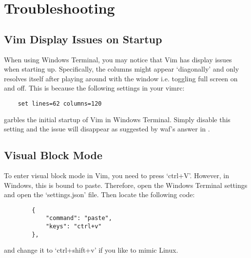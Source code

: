 \section{Troubleshooting}
\subsection{Vim Display Issues on Startup}
When using Windows Terminal, you may notice that Vim has display issues when
starting up. Specifically, the columns might appear `diagonally' and only
resolves itself after playing around with the window i.e. toggling full screen
on and off. This is because the following settings in your vimrc:
\begin{lstlisting}
    set lines=62 columns=120
\end{lstlisting}
garbles the initial startup of Vim in Windows Terminal. Simply disable this
setting and the issue will disappear as suggested by waf's answer in
\cite{tompounceonGit2020vim}.

\subsection{Visual Block Mode}
To enter visual block mode in Vim, you need to press `ctrl+V'. However, in
Windows, this is bound to paste. Therefore, open the Windows Terminal settings
and open the `settings.json' file. Then locate the following code:
\begin{lstlisting}
        {
            "command": "paste",
            "keys": "ctrl+v"
        },
\end{lstlisting}
and change it to `ctrl+shift+v' if you like to mimic Linux.

